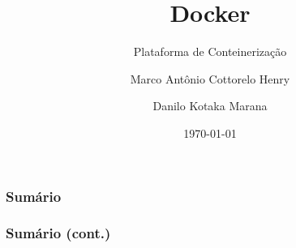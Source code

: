 \documentclass{beamer}
\title{Docker}
\subtitle{Plataforma de Conteinerização}
\author[Marco, DKM]{Marco Antônio Cottorelo Henry\inst{1} \and Danilo Kotaka Marana\inst{2}}
\institute[UEL]{Universidade Estadual De Londrina}
\date{\today}
\begin{document}
  \frame{\titlepage}

  \begin{frame}
    \frametitle{Sumário}
    \tableofcontents[sections={1-9}]
  \end{frame}

  \begin{frame}
    \frametitle{Sumário (cont.)}
    \tableofcontents[sections={10-19}]
  \end{frame}

  
  
  
  
  
  

  
  
  
  
  
  

  
  
  

  
  
  

  
\end{document}
